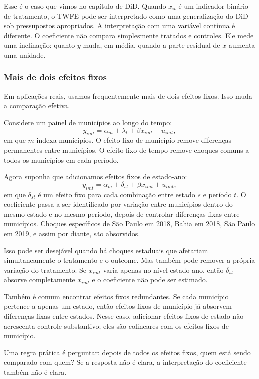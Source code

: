 \documentclass[
]{article}
\begin{document}
Esse é o caso que vimos no capítulo de DiD. Quando \(x_{it}\) é um indicador binário de tratamento, o TWFE pode ser interpretado como uma generalização do DiD sob pressupostos apropriados. A interpretação com uma variável contínua é diferente. O coeficiente não compara simplesmente tratados e controles. Ele mede uma inclinação: quanto \(y\) muda, em média, quando a parte residual de \(x\) aumenta uma unidade.

\subsubsection{Mais de dois efeitos fixos}\label{mais-de-dois-efeitos-fixos}

Em aplicações reais, usamos frequentemente mais de dois efeitos fixos. Isso muda a comparação efetiva.

Considere um painel de municípios ao longo do tempo:
\[
y_{imt} = \alpha_m + \lambda_t + \beta x_{imt} + u_{imt},
\]
em que \(m\) indexa municípios. O efeito fixo de município remove diferenças permanentes entre municípios. O efeito fixo de tempo remove choques comuns a todos os municípios em cada período.

Agora suponha que adicionamos efeitos fixos de estado-ano:
\[
y_{imt} = \alpha_m + \delta_{st} + \beta x_{imt} + u_{imt},
\]
em que \(\delta_{st}\) é um efeito fixo para cada combinação entre estado \(s\) e período \(t\). O coeficiente passa a ser identificado por variação entre municípios dentro do mesmo estado e no mesmo período, depois de controlar diferenças fixas entre municípios. Choques específicos de São Paulo em 2018, Bahia em 2018, São Paulo em 2019, e assim por diante, são absorvidos.

Isso pode ser desejável quando há choques estaduais que afetariam simultaneamente o tratamento e o outcome. Mas também pode remover a própria variação do tratamento. Se \(x_{imt}\) varia apenas no nível estado-ano, então \(\delta_{st}\) absorve completamente \(x_{imt}\) e o coeficiente não pode ser estimado.

Também é comum encontrar efeitos fixos redundantes. Se cada município pertence a apenas um estado, então efeitos fixos de município já absorvem diferenças fixas entre estados. Nesse caso, adicionar efeitos fixos de estado não acrescenta controle substantivo; eles são colineares com os efeitos fixos de município.

Uma regra prática é perguntar: depois de todos os efeitos fixos, quem está sendo comparado com quem? Se a resposta não é clara, a interpretação do coeficiente também não é clara.
\end{document}
